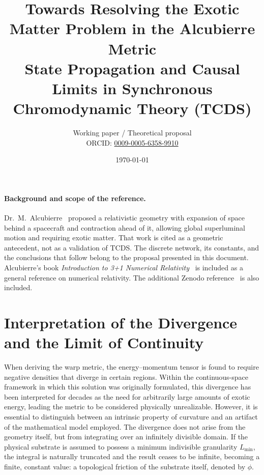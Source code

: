 \documentclass[10pt,a4paper,twocolumn]{article}
\title{\textbf{Towards Resolving the Exotic Matter Problem in the Alcubierre Metric}\\[0.5em]
    \large State Propagation and Causal Limits in Synchronous Chromodynamic Theory (TCDS)}
\author{Working paper / Theoretical proposal\\[0.4em]
    \small ORCID: \href{https://orcid.org/0009-0005-6358-9910}{0009-0005-6358-9910}}
\date{\today}
\begin{document}

\paragraph{Background and scope of the reference.}
Dr.~M.~Alcubierre~\cite{alcubierre1994} proposed a relativistic geometry with expansion of space behind a spacecraft and contraction ahead of it, allowing global superluminal motion and requiring exotic matter. That work is cited as a geometric antecedent, not as a validation of TCDS. The discrete network, its constants, and the conclusions that follow belong to the proposal presented in this document.
Alcubierre's book \textit{Introduction to 3+1 Numerical Relativity}~\cite{alcubierre2008} is included as a general reference on numerical relativity. The additional Zenodo reference~\cite{zenodo22639220} is also included.

\section{Interpretation of the Divergence and the Limit of Continuity}
\label{sec:interpretacion-divergencia}

When deriving the warp metric, the energy--momentum tensor is found to require negative densities that diverge in certain regions. Within the continuous-space framework in which this solution was originally formulated, this divergence has been interpreted for decades as the need for arbitrarily large amounts of exotic energy, leading the metric to be considered physically unrealizable. However, it is essential to distinguish between an intrinsic property of curvature and an artifact of the mathematical model employed. The divergence does not arise from the geometry itself, but from integrating over an infinitely divisible domain. If the physical substrate is assumed to possess a minimum indivisible granularity \(L_{\text{min}}\), the integral is naturally truncated and the result ceases to be infinite, becoming a finite, constant value: a topological friction of the substrate itself, denoted by \(\phi\).
\end{document}
